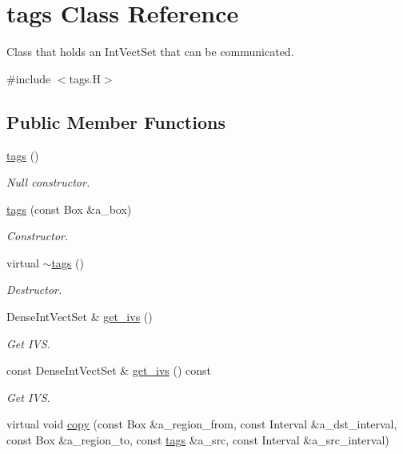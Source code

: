 \hypertarget{classtags}{}\section{tags Class Reference}
\label{classtags}


Class that holds an Int\+Vect\+Set that can be communicated.  




{\ttfamily \#include $<$tags.\+H$>$}

\subsection*{Public Member Functions}
\begin{DoxyCompactItemize}
\item 
\hyperlink{classtags_a1ec0a0a1ae4c9929b04c2d7e5600919c}{tags} ()
\begin{DoxyCompactList}\small\item\em Null constructor. \end{DoxyCompactList}\item 
\hyperlink{classtags_a974da8fd26e453e0df90cb9c2de73f9c}{tags} (const Box \&a\+\_\+box)
\begin{DoxyCompactList}\small\item\em Constructor. \end{DoxyCompactList}\item 
virtual \hyperlink{classtags_a23cb123df97cf735a1f4bb17d8ee1f8a}{$\sim$tags} ()
\begin{DoxyCompactList}\small\item\em Destructor. \end{DoxyCompactList}\item 
Dense\+Int\+Vect\+Set \& \hyperlink{classtags_a03216e6a41c41b1b1f87bda34534b996}{get\+\_\+ivs} ()
\begin{DoxyCompactList}\small\item\em Get I\+VS. \end{DoxyCompactList}\item 
const Dense\+Int\+Vect\+Set \& \hyperlink{classtags_adc92583ea93b1bdc03b11ca580581eb1}{get\+\_\+ivs} () const 
\begin{DoxyCompactList}\small\item\em Get I\+VS. \end{DoxyCompactList}\item 
virtual void \hyperlink{classtags_a02c95fe16aa32524ccd9f752bd087b73}{copy} (const Box \&a\+\_\+region\+\_\+from, const Interval \&a\+\_\+dst\+\_\+interval, const Box \&a\+\_\+region\+\_\+to, const \hyperlink{classtags}{tags} \&a\+\_\+src, const Interval \&a\+\_\+src\+\_\+interval)

\end{DoxyCompactItemize}
